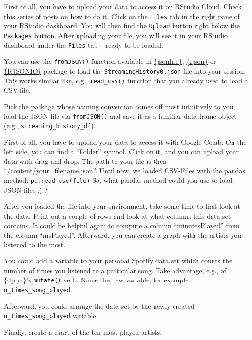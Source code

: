 \documentclass[
  11pt,
]{book}
\newenvironment{tips}[1]
  {
  \begin{itemize}
  \footnotesize
  \renewcommand{\labelitemi}{
    \raisebox{-.7\height}[0pt][0pt]{
      {\setkeys{Gin}{width=3em,keepaspectratio}
        \texttt{[image: images/\#1.png]}}
    }
  }
  \setlength{\fboxsep}{1em}
  \begin{rbox}
  \item
  }
  {
  \end{rbox}
  \end{itemize}
  }
\newenvironment{tipsp}[1]
  {
  \begin{itemize}
  \footnotesize
  \renewcommand{\labelitemi}{
    \raisebox{-.7\height}[0pt][0pt]{
      {\setkeys{Gin}{width=3em,keepaspectratio}
        \texttt{[image: images/\#1.png]}}
    }
  }
  \setlength{\fboxsep}{1em}
  \begin{pbox}
  \item
  }
  {
  \end{pbox}
  \end{itemize}
  }
\begin{document}
\begin{tips}r

First of all, you have to upload your data to access it on RStudio Cloud. Check \href{https://community.rstudio.com/t/importing-data-into-r-studio-cloud/14332/5}{this} series of posts on how to do it. Click on the \texttt{Files} tab in the right pane of your RStudio dashboard. You will then find the \texttt{Upload} button right below the \texttt{Packages} button. After uploading your file, you will see it in your RStudio dashboard under the \texttt{Files} tab -- ready to be loaded.

You can use the \texttt{fromJSON()} function available in \href{https://cran.r-project.org/package=jsonlite}{\{jsonlite\}}, \href{https://cran.r-project.org/package=rjson}{\{rjson\}} or \href{https://cran.r-project.org/package=RJSONIO}{\{RJSONIO\}} package to load the \texttt{StreamingHistory0.json} file into your session. This works similar like, e.g., \texttt{read\_csv()} function that you already used to load a CSV file.

Pick the package whose naming convention comes off most intuitively to you, load the JSON file via \texttt{fromJSON()} and save it as a familiar data frame object (e.g., \texttt{streaming\_history\_df}).

\end{tips}

\begin{tipsp}p

First of all, you have to upload your data to access it with Google Colab. On the left side, you can find a ``Folder'' symbol. Click on it, and you can upload your data with drag and drop. The path to your file is then ``/content/your\_filename.json''.
Until now, we loaded CSV-Files with the pandas method:
\texttt{pd.read\_csv(file)}
So, what pandas method could you use to load JSON files ;) ?

\end{tipsp}

After you loaded the file into your environment, take some time to first look at the data. Print out a couple of rows and look at what columns this data set contains. It could be helpful again to compute a column ``minutesPlayed'' from the column ``msPlayed''.
Afterward, you can create a graph with the artists you listened to the most.

\begin{tips}r

You could add a variable to your personal Spotify data set which counts the number of times you listened to a particular song. Take advantage, e.g., of \{dplyr\}'s \texttt{mutate()} verb. Name the new variable, for example \texttt{n\_times\_song\_played}.

Afterward, you could arrange the data set by the newly created \texttt{n\_times\_song\_played} variable.

Finally, create a chart of the ten most played artists.

\end{tips}
\end{document}
